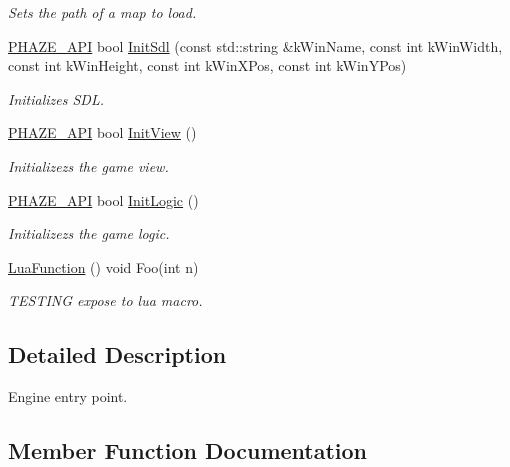 \begin{DoxyCompactItemize}
\begin{DoxyCompactList}\small\item\em Sets the path of a map to load. \end{DoxyCompactList}\item 
\mbox{\hyperlink{_macros_8h_a9ce0e6835f82908079752fa4ebe70dc9}{P\+H\+A\+Z\+E\+\_\+\+A\+PI}} bool \mbox{\hyperlink{class_application_a751167b5a3e144289528c9f0e1087943}{Init\+Sdl}} (const std\+::string \&k\+Win\+Name, const int k\+Win\+Width, const int k\+Win\+Height, const int k\+Win\+X\+Pos, const int k\+Win\+Y\+Pos)
\begin{DoxyCompactList}\small\item\em Initializes S\+DL. \end{DoxyCompactList}\item 
\mbox{\hyperlink{_macros_8h_a9ce0e6835f82908079752fa4ebe70dc9}{P\+H\+A\+Z\+E\+\_\+\+A\+PI}} bool \mbox{\hyperlink{class_application_accc91649cfb2e644112a886274c8ddda}{Init\+View}} ()
\begin{DoxyCompactList}\small\item\em Initializezs the game view. \end{DoxyCompactList}\item 
\mbox{\hyperlink{_macros_8h_a9ce0e6835f82908079752fa4ebe70dc9}{P\+H\+A\+Z\+E\+\_\+\+A\+PI}} bool \mbox{\hyperlink{class_application_acc45b42922f5d8bba477da90b36fa5c8}{Init\+Logic}} ()
\begin{DoxyCompactList}\small\item\em Initializezs the game logic. \end{DoxyCompactList}\item 
\mbox{\label{class_application_ae6456d7c0f1a5a11325e00673b999b8d}} 
\mbox{\hyperlink{class_application_ae6456d7c0f1a5a11325e00673b999b8d}{Lua\+Function}} () void Foo(int n)
\begin{DoxyCompactList}\small\item\em T\+E\+S\+T\+I\+NG expose to lua macro. \end{DoxyCompactList}\end{DoxyCompactItemize}


\subsection{Detailed Description}
Engine entry point. 

\subsection{Member Function Documentation}
\mbox{\label{class_application_acc45b42922f5d8bba477da90b36fa5c8}} 
